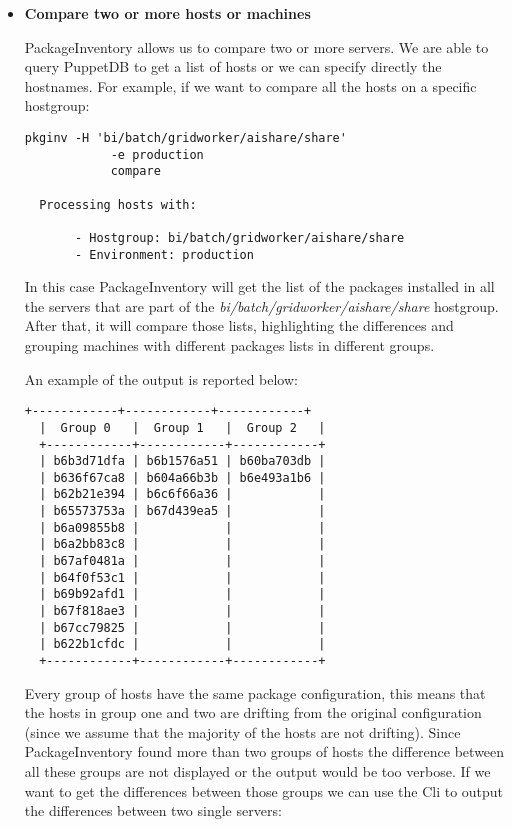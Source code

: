 \begin{itemize}
  \item \textbf{Compare two or more hosts or machines}

  PackageInventory allows us to compare two or more servers. We are able
  to query PuppetDB to get a list of hosts or we can specify directly the
  hostnames. For example, if we want to compare all the hosts on
  a specific hostgroup:
  
  \begin{lstlisting}[frame=single]
  pkginv -H 'bi/batch/gridworker/aishare/share'
            -e production
            compare
  
  Processing hosts with:
  
       - Hostgroup: bi/batch/gridworker/aishare/share
       - Environment: production
  \end{lstlisting}

  In this case PackageInventory will get the list of the packages
  installed in all the servers that are part of the
  \textit{bi/batch/gridworker/aishare/share} hostgroup. After that, it
  will compare those lists, highlighting the differences and grouping
  machines with different packages lists in different groups.

  An example of the output is reported below:

  \begin{lstlisting}[frame=single]
  +------------+------------+------------+
  |  Group 0   |  Group 1   |  Group 2   |
  +------------+------------+------------+
  | b6b3d71dfa | b6b1576a51 | b60ba703db |
  | b636f67ca8 | b604a66b3b | b6e493a1b6 |
  | b62b21e394 | b6c6f66a36 |            |
  | b65573753a | b67d439ea5 |            |
  | b6a09855b8 |            |            |
  | b6a2bb83c8 |            |            |
  | b67af0481a |            |            |
  | b64f0f53c1 |            |            |
  | b69b92afd1 |            |            |
  | b67f818ae3 |            |            |
  | b67cc79825 |            |            |
  | b622b1cfdc |            |            |
  +------------+------------+------------+
  \end{lstlisting}

  Every group of hosts have the same package configuration, this means
  that the hosts in group one and two are drifting from the original
  configuration (since we assume that the majority of the hosts are not
  drifting). Since PackageInventory found more than two groups of hosts
  the difference between all these groups are not displayed or the output
  would be too verbose. If we want to get the differences between those
  groups we can use the Cli to output the differences between two single
  servers:


\end{itemize}

